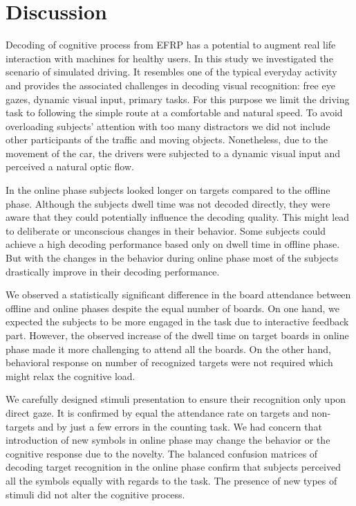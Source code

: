 \documentclass[12pt]{iopart}
\begin{document}
\section{Discussion}
\label{sec:discussion}
Decoding of cognitive process from EFRP has a potential to augment
real life interaction with machines for healthy users.
In this study we investigated the scenario of simulated driving.
It resembles one of the typical everyday activity
and provides the associated challenges in decoding visual recognition:
free eye gazes, dynamic visual input, primary tasks.
For this purpose we limit the driving task to following 
the simple route at a comfortable and natural speed.
To avoid overloading subjects' attention with too many distractors
we did not include other participants of the traffic and  moving objects.
Nonetheless, due to the movement of the car, the drivers
were subjected to a dynamic visual input and perceived a
natural optic flow.


In the online phase subjects looked longer on targets compared to the offline phase.
Although the subjects dwell time was not decoded directly, they were aware
that they could potentially influence the decoding quality. This might
lead to deliberate or unconscious changes in their behavior.
Some subjects could achieve a high decoding performance based
only on dwell time in offline phase. But with the changes in the behavior
during online phase most of the subjects drastically improve in their decoding performance.

We observed a statistically significant difference in the board attendance
between offline and online phases despite the equal number of boards.
On one hand, we expected the subjects to 
be more engaged in the task due to interactive feedback part.
However, the observed increase of the dwell time on target boards 
in online phase made it more challenging to attend all
the boards.
On the other hand, behavioral response on number of recognized targets
were not required which might relax the cognitive load.

We carefully designed stimuli presentation to ensure their recognition
only upon direct gaze.
It is confirmed by equal
the attendance rate on targets and non-targets and 
by just a few errors in the counting task.
We had concern that introduction of new symbols in online phase
may change the behavior or the cognitive response due to the novelty.
The balanced confusion matrices of decoding target recognition in the online phase
confirm that subjects perceived all the symbols equally with regards
to the task. The presence of new types of stimuli did not alter
the cognitive process.
\end{document}
